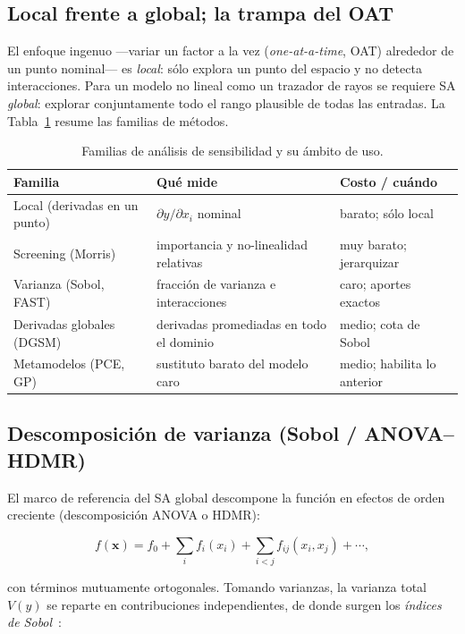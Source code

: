 \documentclass[11pt,a4paper]{article}
\begin{document}
\subsection{Local frente a global; la trampa del OAT}

El enfoque ingenuo —variar un factor a la vez (\emph{one-at-a-time}, OAT) alrededor
de un punto nominal— es \emph{local}: sólo explora un punto del espacio y no detecta
interacciones. Para un modelo no lineal como un trazador de rayos se requiere SA
\emph{global}: explorar conjuntamente todo el rango plausible de todas las entradas.
La Tabla~\ref{tab:sataxonomia} resume las familias de métodos.

\begin{table}[h]
\centering
\caption{Familias de análisis de sensibilidad y su ámbito de uso.}
\label{tab:sataxonomia}
\small
\begin{tabular}{lll}
\toprule
Familia & Qué mide & Costo / cuándo \\
\midrule
Local (derivadas en un punto) & $\partial y/\partial x_i$ nominal & barato; sólo local \\
Screening (Morris) & importancia y no-linealidad relativas & muy barato; jerarquizar \\
Varianza (Sobol, FAST) & fracción de varianza e interacciones & caro; aportes exactos \\
Derivadas globales (DGSM) & derivadas promediadas en todo el dominio & medio; cota de Sobol \\
Metamodelos (PCE, GP) & sustituto barato del modelo caro & medio; habilita lo anterior \\
\bottomrule
\end{tabular}
\end{table}

\subsection{Descomposición de varianza (Sobol / ANOVA--HDMR)}\label{sec:sobol}

El marco de referencia del SA global descompone la función en efectos de orden
creciente (descomposición ANOVA o HDMR):

\begin{equation}
f(\mathbf{x}) = f_0 + \sum_i f_i(x_i) + \sum_{i<j} f_{ij}(x_i,x_j) + \cdots,
\label{eq:hdmr}
\end{equation}

con términos mutuamente ortogonales. Tomando varianzas, la varianza total $V(y)$ se
reparte en contribuciones independientes, de donde surgen los \emph{índices de
Sobol}~\cite{sobol2001,saltelli2008}:
\end{document}
